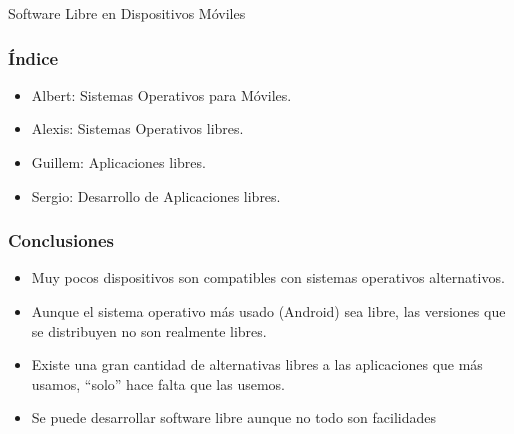 \documentclass[numfooter]{beamer}
\begin{document}
\begin{frame}
    \centering
    \Huge{Software Libre en Dispositivos Móviles}
\end{frame}

\begin{frame}
    \frametitle{Índice}
    \begin{itemize}
        \item Albert: Sistemas Operativos para Móviles.
        \item Alexis: Sistemas Operativos libres.
        \item Guillem: Aplicaciones libres.
        \item Sergio: Desarrollo de Aplicaciones libres.
    \end{itemize}
\end{frame}









\begin{frame}
    \frametitle{Conclusiones}
    \begin{itemize}
        \item Muy pocos dispositivos son compatibles con sistemas operativos alternativos.
        \item Aunque el sistema operativo más usado (Android) sea libre, las versiones que se distribuyen no son realmente libres.
        \item Existe una gran cantidad de alternativas libres a las aplicaciones que más usamos, ``solo'' hace falta que las usemos.
        \item Se puede desarrollar software libre aunque no todo son facilidades
    \end{itemize}    
\end{frame}
\end{document}
